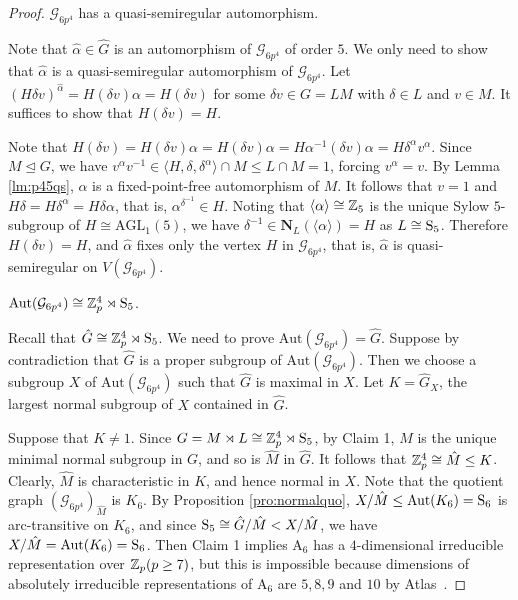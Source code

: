 \documentclass[12pt,reqno]{amsart}
\renewcommand\a{\alpha}  \renewcommand\b{\beta}
\newcommand\A{\mathrm{A}} \newcommand\AGL{\mathrm{AGL}} \newcommand\AGammaL{\mathrm{A\Gamma L}} \newcommand\Alt{\mathrm{Alt}} \newcommand\ASL{\mathrm{ASL}} \newcommand\ASigmaL{\mathrm{A \Sigma L}} \newcommand\Aut{\mathrm{Aut}}
\newcommand\N{\mathbf{N}}
\newcommand{\cG}{\mathcal{G}}
\numberwithin {equation} {section}
\begin{document}
\begin{proof}
\vskip 0.2cm
 $\cG_{6p^4}$ has a quasi-semiregular automorphism.

Note that $\hat{\alpha}\in\hat{G}$ is an automorphism of  $\cG_{6p^4}$ of order $5$. We only need to show that $\hat{\alpha}$ is a quasi-semiregular automorphism of $\cG_{6p^4}$. Let $(H\delta v)^{\hat{\alpha}}=H(\delta v)\alpha=H(\delta v)$ for some $\delta v\in G=LM$ with $\delta\in L$ and $v\in M$. It suffices to show that $H(\delta v)=H$.

Note that $H(\delta v)=H(\delta v)\alpha=H(\delta v)\alpha=H\alpha^{-1}(\delta v)\alpha=H\delta^\alpha v^\alpha$.
Since $M\unlhd G$, we have $v^\a v^{-1}\in \langle H,\delta,\delta^\a\rangle\cap M\leq L\cap M=1$, forcing $v^\a=v$. By Lemma \ref{lm:p45qs}, $\a$ is a fixed-point-free automorphism of $M$. It follows that $v=1$ and $H\delta=H\delta^\alpha=H\delta\alpha$, that is, $\alpha^{\delta^{-1}} \in H$. Noting that $\langle \alpha\rangle \cong \mathbb{Z}_5$ is the unique Sylow $5$-subgroup of $H \cong \AGL_1(5)$, we have $\delta^{-1} \in \N_{L}(\langle \alpha\rangle )=H$ as $L\cong
\mathrm{S}_5$. Therefore $H(\delta v)=H$, and $\hat{\alpha}$ fixes only the vertex $H$ in $\cG_{6p^4}$, that is,  $\hat{\alpha}$ is quasi-semiregular on $V(\cG_{6p^4})$.


\vskip 0.2cm
  $\Aut(\cG_{6p^4})\cong \ZZ_p^4\rtimes\Sy_5 $.

Recall that $\hat{G}\cong \mathbb{Z}_p^4\rtimes\mathrm{S}_5$. We need to prove $\Aut(\cG_{6p^4})=\hat{G}$.  Suppose by contradiction that $\hat{G}$ is a proper subgroup of $\Aut(\cG_{6p^4}) $. Then we choose a subgroup $X$ of $\Aut(\cG_{6p^4})$ such that $\hat{G}$ is maximal in $X$. Let $K=\hat{G}_X$, the largest normal subgroup of $X$ contained in $\hat{G}$.

Suppose that $K \neq 1$. Since $G=M\rtimes L\cong \mathbb{Z}_p^4\rtimes\mathrm{S}_5$, by Claim 1, $M$ is the unique minimal normal subgroup in $G$, and so is $\hat{M}$ in $\hat{G}$. It follows that $\mathbb{Z}_p^4\cong \hat{M}\leq K$. Clearly, $\hat{M}$ is characteristic in $K$, and hence normal in $X$. Note that the quotient graph $(\cG_{6p^4})_{\hat{M}}$ is $K_6$. By Proposition \ref{pro:normalquo}, $X/\hat{M}\leq \Aut(K_6) =\Sy_6$ is  arc-transitive on $K_6$,  and since
$\mathrm{S}_5\cong \hat{G}/\hat{M}<X/\hat{M} $, we have $X/\hat{M}=\Aut(K_6)=\Sy_6$.   Then Claim 1 implies  $\A_6$ has a  $4$-dimensional irreducible representation over $ \mathbb{Z}_p (p\geq 7)$, but this is impossible because dimensions of absolutely irreducible representations of $\A_6$ are $5,8,9$ and $10$ by Atlas~\cite[p.5]{Atlas}.


\end{proof}
\end{document}
